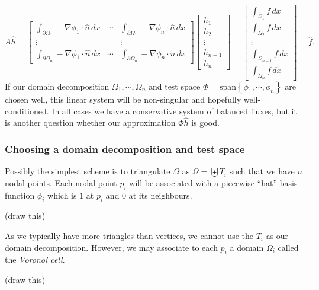\documentclass[11pt,a4paper]{memoir}
\newcommand{\om}{{\Omega}}
\newcommand{\pom}{{\partial\Omega}}
\begin{document}
\newcommand{\integralentry}[2]{\int_{\pom_{#1}}-\nabla\phi_{#2}\cdot\hat{n}\,dx}
\begin{equation}\label{poisson_matrix_equation}
    A\hat{h} = \begin{bmatrix}
            \integralentry{1}{1} & \cdots & \integralentry{1}{n} \\
            \vdots & & \vdots \\
            \integralentry{n}{1} & \cdots & \integralentry{n}{n}
            \end{bmatrix}
    \begin{bmatrix} h_1 \\ h_2 \\ \vdots \\ h_{n-1} \\ h_n \end{bmatrix}
    =
    \begin{bmatrix} \int_{\om_1}f\,dx \\ \int_{\om_2}f\,dx \\ \vdots \\ \int_{\om_{n-1}}f\,dx \\ \int_{\om_n}f\,dx \end{bmatrix}
    = \hat{f}.
\end{equation}
If our domain decomposition $\Omega_1,\cdots,\Omega_n$ and test space $\Phi = \text{span}\left\{\phi_1,\cdots,\phi_n\right\}$
are chosen well, this linear system will be non-singular and hopefully well-conditioned.
In all cases we have a conservative system of balanced fluxes, but it is another question whether our approximation
$\Phi\hat{h}$ is good.

\subsubsection{Choosing a domain decomposition and test space}
Possibly the simplest scheme is to triangulate $\Omega$ as
    $\Omega = \biguplus T_i$
such that we have $n$ nodal points.
Each nodal point $p_i$ will be associated with a piecewise ``hat'' basis function $\phi_i$ which is $1$ at $p_i$ and
$0$ at its neighbours.

\vskip 0.2in
(draw this)
\vskip 0.2in

As we typically have more triangles than vertices, we cannot use the $T_i$ as our domain decomposition. However, we may
associate to each $p_i$ a domain $\Omega_i$ called the \textit{Voronoi cell}.

\vskip 0.2in
(draw this)
\vskip 0.2in
\end{document}

